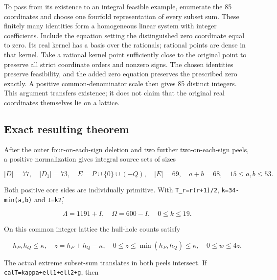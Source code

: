 \documentclass[10pt,a4paper]{article}
\theoremstyle{definition}
\begin{document}
To pass from its existence to an integral feasible example,\allowbreak{} enumerate
the 85 coordinates and choose one fourfold representation of every
subset sum. These finitely many identities form a homogeneous linear
system with integer coefficients. Include the equation setting the
distinguished zero coordinate equal to zero. Its real kernel has a basis
over the rationals; rational points are dense in that kernel. Take a
rational kernel point sufficiently close to the original point to
preserve all strict coordinate orders and nonzero signs. The chosen
identities preserve feasibility,\allowbreak{} and the added zero equation preserves
the prescribed zero exactly. A positive common-denominator scale then
gives 85 distinct integers. This argument transfers existence; it does
not claim that the original real coordinates themselves lie on a
lattice.

\hypertarget{exact-resulting-theorem}{%
\subsection{Exact resulting theorem}\label{exact-resulting-theorem}}

After the outer four-on-each-sign deletion and two further
two-on-each-sign peels,\allowbreak{} a positive normalization gives integral source
sets of sizes

\[
 |D|=\allowbreak{}77,\allowbreak{}\quad |D_1|=\allowbreak{}73,\allowbreak{}\quad
 E=\allowbreak{}P\cup\{0\}\cup(-Q),\allowbreak{}\quad |E|=\allowbreak{}69,\allowbreak{}
 \quad a+\allowbreak{}b=\allowbreak{}68,\allowbreak{}\quad15\le a,\allowbreak{}b\le53.
\]

Both positive core sides are individually primitive. With
\texttt{T\_\allowbreak{}\allowbreak{}r=\allowbreak{}r(r+\allowbreak{}1)/\allowbreak{}2},\allowbreak{}
\texttt{k=\allowbreak{}34-min(a,\allowbreak{}b)} and
\texttt{I=\allowbreak{}k\^2},\allowbreak{}

\[
 \Lambda=\allowbreak{}1191+\allowbreak{}I,\allowbreak{}\quad \Omega=\allowbreak{}600-I,\allowbreak{}
 \quad0\le k\le19.
\]

On this common integer lattice the hull-hole counts satisfy

\[
 h_P,\allowbreak{}h_Q\le\kappa,\allowbreak{}\quad z=\allowbreak{}h_P+\allowbreak{}h_Q-\kappa,\allowbreak{}
 \quad0\le z\le\min(h_P,\allowbreak{}h_Q)\le\kappa,\allowbreak{}
 \quad0\le w\le4z.
\]

The actual extreme subset-sum translates in both peels intersect. If
\texttt{calT=\allowbreak{}kappa+\allowbreak{}ell1+\allowbreak{}ell2+\allowbreak{}g},\allowbreak{} then
\end{document}
